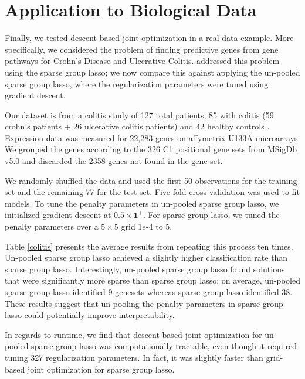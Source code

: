 \documentclass[12pt,letterpaper]{article}
\begin{document}
\section{Application to Biological Data}\label{realDataResults}
Finally, we tested descent-based joint optimization in a real data example. More specifically, we considered the problem of finding predictive genes from gene pathways for Crohn's Disease and Ulcerative Colitis. \citet{simon2013sparse} addressed this problem using the sparse group lasso; we now compare this against applying the un-pooled sparse group lasso, where the regularization parameters were tuned using gradient descent.

Our dataset is from a colitis study of 127 total patients, 85 with colitis (59 crohn's patients + 26 ulcerative colitis patients) and 42 healthy controls \citep{burczynski2006molecular}. Expression data was measured for 22,283 genes on affymetrix U133A microarrays. We grouped the genes according to the 326 C1 positional gene sets from MSigDb v5.0 \citep{subramanian2005gene} and discarded the 2358 genes not found in the gene set.

We randomly shuffled the data and used the first 50 observations for the training set and the remaining 77 for the test set. Five-fold cross validation was used to fit models. To tune the penalty parameters in un-pooled sparse group lasso, we initialized gradient descent at $0.5 \times \boldsymbol 1^\top$. For sparse group lasso, we tuned the penalty parameters over a $5 \times 5$ grid 1$e$-4 to 5.

Table \ref{colitis} presents the average results from repeating this process ten times. Un-pooled sparse group lasso achieved a slightly higher classification rate than sparse group lasso. Interestingly, un-pooled sparse group lasso found solutions that were significantly more sparse than sparse group lasso; on average, un-pooled sparse group lasso identified 9 genesets whereas sparse group lasso identified 38. These results suggest that un-pooling the penalty parameters in sparse group lasso could potentially improve interpretability.

In regards to runtime, we find that descent-based joint optimization for un-pooled sparse group lasso was computationally tractable, even though it required tuning 327 regularization parameters. In fact, it was slightly faster than grid-based joint optimization for sparse group lasso.
\end{document}
